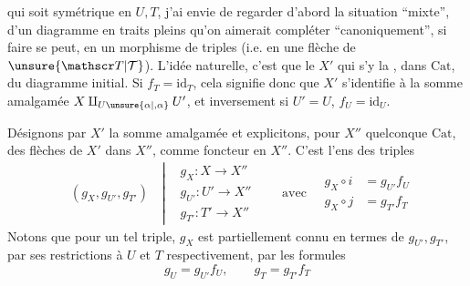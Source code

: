 qui soit symétrique en $U,T$, j'ai envie
de regarder d'abord la situation ``mixte'', d'un
diagramme en traits pleins
qu'on aimerait compléter ``canoniquement'', si faire
se peut, en un morphisme de triples (i.e. en
une flèche de $\unsure{\mathscr T|\mathcal T}$). L'idée naturelle,
c'est que le $X'$ qui s'y  
la  , dans $\mathrm{Cat}$, du diagramme
initial. Si  $f_T=\mathrm{id}_T$, cela signifie donc
que $X'$ s'identifie à la somme amalgamée
$X\amalg_{U\unsure{\alpha|{,}\alpha}}U'$, et inversement si $U'=U$, $f_U=\mathrm{id}_U$.

Désignons par $X'$ la somme amalgamée et
 explicitons, pour $X''$ quelconque  $\mathrm{Cat}$,
 des flèches  de $X'$ dans $X''$,  comme
foncteur en $X''$. C'est l'ens des triples
\[
\begin{aligned}
&(g_X,g_{U'},g_{T'})\quad
\left|\begin{aligned}
&g_X:X\to X''\\
&g_{U'}:U'\to X''\\
&g_{T'}:T'\to X''
\end{aligned}\right.\qquad\text{avec}\quad
\begin{aligned}
g_X\circ i&=g_{U'}f_U\\
g_X\circ j&=g_{T'}f_T
\end{aligned}
\end{aligned}\tag*{(*)}
\]
Notons que pour un tel triple,
$g_X$ est partiellement connu  en termes
de $g_{U'},g_{T'}$, par ses restrictions  à
$U$ et $T$ respectivement, par les formules
\[
g_U=g_{U'}f_U,\qquad g_T=g_{T'}f_T
\]
